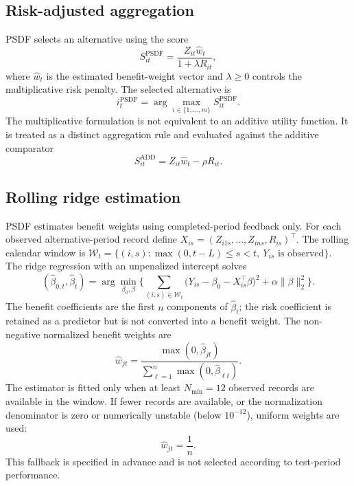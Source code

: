 \documentclass[12pt,a4paper]{article}
\begin{document}
\subsection{Risk-adjusted aggregation}
PSDF selects an alternative using the score
\begin{equation}S^{\mathrm{PSDF}}_{it}=\frac{Z_{it}\hat w_t}{1+\lambda R_{it}},\end{equation}
where $\hat w_t$ is the estimated benefit-weight vector and $\lambda\ge0$ controls the multiplicative risk penalty. The selected alternative is
\begin{equation}i^{\mathrm{PSDF}}_t=\arg\max_{i\in\{1,\dots,m\}}S^{\mathrm{PSDF}}_{it}.\end{equation}
The multiplicative formulation is not equivalent to an additive utility function. It is treated as a distinct aggregation rule and evaluated against the additive comparator
\begin{equation}S^{\mathrm{ADD}}_{it}=Z_{it}\hat w_t-\rho R_{it}.\end{equation}

\subsection{Rolling ridge estimation}
PSDF estimates benefit weights using completed-period feedback only. For each observed alternative-period record define $X_{is}=(Z_{i1s},\dots,Z_{ins},R_{is})^\top$. The rolling calendar window is $\mathcal W_t=\{(i,s):\max(0,t-L)\le s<t,\ Y_{is}\text{ is observed}\}$. The ridge regression with an unpenalized intercept solves
\begin{equation}(\hat\beta_{0,t},\hat\beta_t)=\arg\min_{\beta_0,\beta}\Big\{\sum_{(i,s)\in\mathcal W_t}\big(Y_{is}-\beta_0-X_{is}^\top\beta\big)^2+\alpha\|\beta\|_2^2\Big\}.\end{equation}
The benefit coefficients are the first $n$ components of $\hat\beta_t$; the risk coefficient is retained as a predictor but is not converted into a benefit weight. The non-negative normalized benefit weights are
\begin{equation}\hat w_{jt}=\frac{\max(0,\hat\beta_{jt})}{\sum_{\ell=1}^n\max(0,\hat\beta_{\ell t})}.\end{equation}
The estimator is fitted only when at least $N_{\min}=12$ observed records are available in the window. If fewer records are available, or the normalization denominator is zero or numerically unstable (below $10^{-12}$), uniform weights are used:
\begin{equation}\hat w_{jt}=\frac1n.\end{equation}
This fallback is specified in advance and is not selected according to test-period performance.
\end{document}
